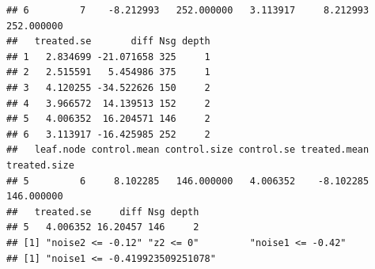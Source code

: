 \begin{knitrout}
\begin{kframe}
\begin{verbatim}
## 6         7    -8.212993   252.000000   3.113917     8.212993   252.000000
##   treated.se       diff Nsg depth
## 1   2.834699 -21.071658 325     1
## 2   2.515591   5.454986 375     1
## 3   4.120255 -34.522626 150     2
## 4   3.966572  14.139513 152     2
## 5   4.006352  16.204571 146     2
## 6   3.113917 -16.425985 252     2
##   leaf.node control.mean control.size control.se treated.mean treated.size
## 5         6     8.102285   146.000000   4.006352    -8.102285   146.000000
##   treated.se     diff Nsg depth
## 5   4.006352 16.20457 146     2
## [1] "noise2 <= -0.12" "z2 <= 0"         "noise1 <= -0.42"
## [1] "noise1 <= -0.419923509251078"
\end{verbatim}
\end{kframe}
\end{knitrout}


